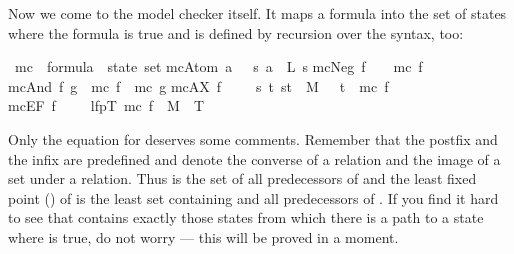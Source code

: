 \begin{isabellebody}
\begin{isamarkuptext}
Now we come to the model checker itself. It maps a formula into the set of
states where the formula is true and is defined by recursion over the syntax,
too:%
\end{isamarkuptext}%
\ mc\ {\isacharcolon}{\isacharcolon}\ {\isachardoublequote}formula\ {\isasymRightarrow}\ state\ set{\isachardoublequote}\isanewline
{}\isanewline
{\isachardoublequote}mc{\isacharparenleft}Atom\ a{\isacharparenright}\ \ {\isacharequal}\ {\isacharbraceleft}s{\isachardot}\ a\ {\isasymin}\ L\ s{\isacharbraceright}{\isachardoublequote}\isanewline
{\isachardoublequote}mc{\isacharparenleft}Neg\ f{\isacharparenright}\ \ \ {\isacharequal}\ {\isacharminus}mc\ f{\isachardoublequote}\isanewline
{\isachardoublequote}mc{\isacharparenleft}And\ f\ g{\isacharparenright}\ {\isacharequal}\ mc\ f\ {\isasyminter}\ mc\ g{\isachardoublequote}\isanewline
{\isachardoublequote}mc{\isacharparenleft}AX\ f{\isacharparenright}\ \ \ \ {\isacharequal}\ {\isacharbraceleft}s{\isachardot}\ {\isasymforall}t{\isachardot}\ {\isacharparenleft}s{\isacharcomma}t{\isacharparenright}\ {\isasymin}\ M\ \ {\isasymlongrightarrow}\ t\ {\isasymin}\ mc\ f{\isacharbraceright}{\isachardoublequote}\isanewline
{\isachardoublequote}mc{\isacharparenleft}EF\ f{\isacharparenright}\ \ \ \ {\isacharequal}\ lfp{\isacharparenleft}{\isasymlambda}T{\isachardot}\ mc\ f\ {\isasymunion}\ {\isacharparenleft}M{\isasyminverse}\ {\isacharbackquote}{\isacharbackquote}\ T{\isacharparenright}{\isacharparenright}{\isachardoublequote}%
\begin{isamarkuptext}%
\noindent
Only the equation for  deserves some comments. Remember that the
postfix \isa{{\isasyminverse}} and the infix \isa{{\isacharbackquote}{\isacharbackquote}} are predefined and denote the
converse of a relation and the image of a set under a relation.  Thus
 is the set of all predecessors of  and the least
fixed point () of  is the least set
 containing  and all predecessors of . If you
find it hard to see that  contains exactly those states from
which there is a path to a state where  is true, do not worry --- this
will be proved in a moment.


\end{isamarkuptext}
\end{isabellebody}
